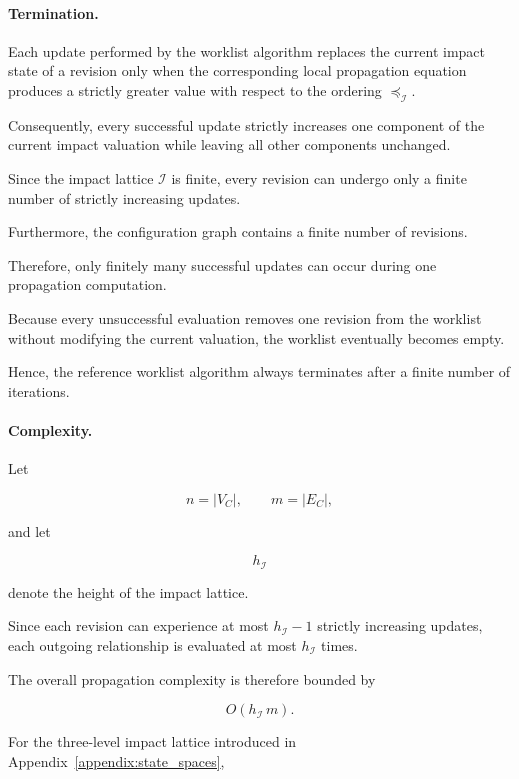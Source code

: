 \documentclass[10pt]{article}
\begin{document}
\paragraph{Termination.}

Each update performed by the worklist algorithm replaces the current impact state of a revision only when the corresponding local propagation equation produces a strictly greater value with respect to the ordering $\preceq_{\mathcal I}$.

Consequently, every successful update strictly increases one component of the current impact valuation while leaving all other components unchanged. 

Since the impact lattice $\mathcal I$
is finite, every revision can undergo only a finite number of strictly increasing updates.

Furthermore, the configuration graph contains a finite number of revisions.

Therefore, only finitely many successful updates can occur during one propagation computation.

Because every unsuccessful evaluation removes one revision from the worklist without modifying the current valuation, the worklist eventually becomes empty.

Hence, the reference worklist algorithm always terminates after a finite number of iterations.

\paragraph{Complexity.}

Let

\[
n
=
|V_C|,
\qquad
m
=
|E_C|,
\]

and let

\[
h_{\mathcal I}
\]

denote the height of the impact lattice.

Since each revision can experience at most $h_{\mathcal I}-1$ strictly increasing updates, each outgoing relationship is evaluated at most $h_{\mathcal I}$
times.

The overall propagation complexity is therefore bounded by

\begin{equation}
	\label{eq:worklist_complexity_final}
	O
	\!\left(
	h_{\mathcal I}
	\,m
	\right).
\end{equation}

For the three-level impact lattice introduced in
Appendix~\ref{appendix:state_spaces},
\end{document}
